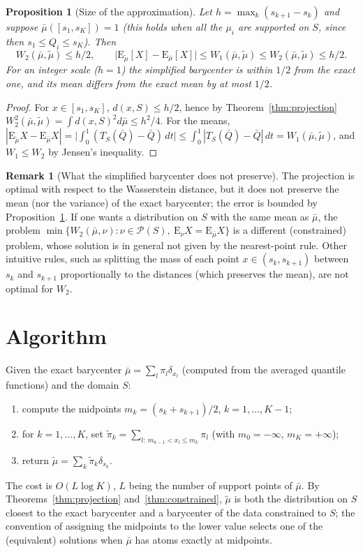 \documentclass[11pt,a4paper]{article}
\newtheorem{proposition}[theorem]{Proposition}
\theoremstyle{definition}
\newtheorem{remark}[theorem]{Remark}
\newcommand{\PS}{\mathcal{P}(S)}
\begin{document}
\begin{proposition}[Size of the approximation]\label{prop:bounds}
Let $h=\max_k(s_{k+1}-s_k)$ and suppose $\bar\mu([s_1,s_K])=1$ (this holds
when all the $\mu_i$ are supported on $S$, since then $s_1\le Q_i\le s_K$).
Then
\[
  W_2(\bar\mu,\tilde\mu)\le h/2,\qquad
  \big|\mathrm{E}_{\tilde\mu}[X]-\mathrm{E}_{\bar\mu}[X]\big|\le W_1(\bar\mu,\tilde\mu)\le W_2(\bar\mu,\tilde\mu)\le h/2 .
\]
For an integer scale ($h=1$) the simplified barycenter is within $1/2$ from
the exact one, and its mean differs from the exact mean by at most $1/2$.
\end{proposition}

\begin{proof}
For $x\in[s_1,s_K]$, $d(x,S)\le h/2$, hence by Theorem~\ref{thm:projection}
$W_2^2(\bar\mu,\tilde\mu)=\int d(x,S)^2d\bar\mu\le h^2/4$. For the means,
$|\mathrm{E}_{\tilde\mu}X-\mathrm{E}_{\bar\mu}X|=\big|\int_0^1(T_S(\bar Q)-\bar Q)\,dt\big|
\le\int_0^1|T_S(\bar Q)-\bar Q|\,dt=W_1(\bar\mu,\tilde\mu)$, and
$W_1\le W_2$ by Jensen's inequality.
\end{proof}

\begin{remark}[What the simplified barycenter does not preserve]
The projection is optimal with respect to the Wasserstein distance, but it does
not preserve the mean (nor the variance) of the exact barycenter; the error is
bounded by Proposition~\ref{prop:bounds}. If one wants a distribution on $S$
with the same mean as $\bar\mu$, the problem
$\min\{W_2(\bar\mu,\nu):\nu\in\PS,\ \mathrm{E}_\nu X=\mathrm{E}_{\bar\mu}X\}$ is
a different (constrained) problem, whose solution is in general not given by
the nearest-point rule. Other intuitive rules, such as splitting the mass of
each point $x\in(s_k,s_{k+1})$ between $s_k$ and $s_{k+1}$ proportionally to
the distances (which preserves the mean), are not optimal for $W_2$.
\end{remark}

\section{Algorithm}

Given the exact barycenter $\bar\mu=\sum_{l}\pi_l\delta_{x_l}$ (computed from
the averaged quantile functions) and the domain $S$:
\begin{enumerate}
  \item compute the midpoints $m_k=(s_k+s_{k+1})/2$, $k=1,\dots,K-1$;
  \item for $k=1,\dots,K$, set
        $\tilde\pi_k=\sum_{l:\ m_{k-1}<x_l\le m_k}\pi_l$ (with $m_0=-\infty$,
        $m_K=+\infty$);
  \item return $\tilde\mu=\sum_k\tilde\pi_k\delta_{s_k}$.
\end{enumerate}
The cost is $O(L\log K)$, $L$ being the number of support points of
$\bar\mu$. By Theorems~\ref{thm:projection} and~\ref{thm:constrained},
$\tilde\mu$ is both the distribution on $S$ closest to the exact barycenter and
a barycenter of the data constrained to $S$; the convention of assigning the
midpoints to the lower value selects one of the (equivalent) solutions when
$\bar\mu$ has atoms exactly at midpoints.
\end{document}
